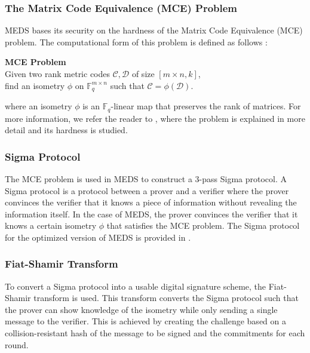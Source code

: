 \documentclass[11pt,a4paper]{report}
\theoremstyle{definition}
\begin{document}
\subsubsection{The Matrix Code Equivalence (MCE) Problem}
MEDS bases its security on the hardness of the Matrix Code Equivalence (MCE) problem. The computational form of this problem is defined as follows \cite{chou2023meds}:
\begin{center}
  \textbf{MCE Problem}\\
  Given two rank metric codes $\mathcal{C}, \mathcal{D}$ of size $[m \times n, k]$,\\
  find an isometry $\phi$ on $\mathbb{F}_q^{m \times n}$ such that $\mathcal{C} = \phi(\mathcal{D})$.
\end{center}
where an isometry $\phi$ is an $\mathbb{F}_q$-linear map that preserves the rank of matrices. For more information, we refer the reader to \cite{reijnders2024hardness}, where the problem is explained in more detail and its hardness is studied.

\subsubsection{Sigma Protocol}
\label{sec:sigmaprotocol}
The MCE problem is used in MEDS to construct a 3-pass Sigma protocol. A Sigma protocol is a protocol between a prover and a verifier where the prover convinces the verifier that it knows a piece of information without revealing the information itself. In the case of MEDS, the prover convinces the verifier that it knows a certain isometry $\phi$ that satisfies the MCE problem. The Sigma protocol for the optimized version of MEDS is provided in \cite{chou2024reducing}.

\subsubsection{Fiat-Shamir Transform}
\label{sec:fiatshamir}
To convert a Sigma protocol into a usable digital signature scheme, the Fiat-Shamir transform \cite{fiat1986prove} is used. This transform converts the Sigma protocol such that the prover can show knowledge of the isometry while only sending a single message to the verifier. This is achieved by creating the challenge based on a collision-resistant hash of the message to be signed and the commitments for each round.
\end{document}
